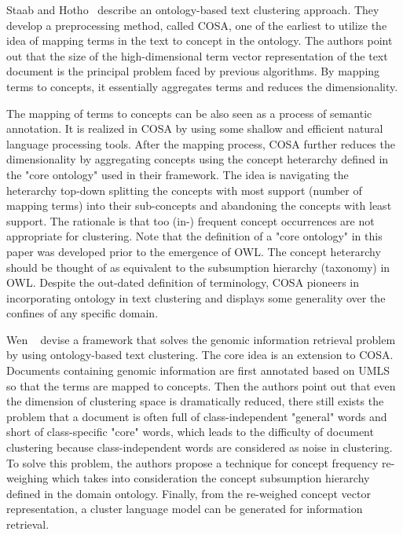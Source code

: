 Staab and Hotho~\cite{StaabH03} describe an ontology-based text clustering approach. They develop a preprocessing method, called COSA, one of the earliest to utilize the idea of mapping terms in the text to concept in the ontology. The authors point out that the size of the high-dimensional term vector representation of the text document is the principal problem faced by previous algorithms. By mapping terms to concepts, it essentially aggregates terms and reduces the dimensionality.

The mapping of terms to concepts can be also seen as a process of semantic annotation. It is realized in COSA by using some shallow and efficient natural language processing tools. After the mapping process, COSA further reduces the dimensionality by aggregating concepts using the concept heterarchy defined in the "core ontology" used in their framework. The idea is navigating the heterarchy top-down splitting the concepts with most support (number of mapping terms) into their sub-concepts and abandoning the concepts with least support. The rationale is that too (in-) frequent concept occurrences are not appropriate for clustering.  Note that the definition of a "core ontology" in this paper was developed prior to the emergence of OWL. The concept heterarchy should be thought of as equivalent to the subsumption hierarchy (taxonomy) in OWL. Despite the out-dated definition of terminology, COSA pioneers in incorporating ontology in text clustering and displays some generality over the confines of any specific domain.

Wen \etal~\cite{Wen2007Ont} devise a framework that solves the genomic information retrieval problem by using ontology-based text clustering. The core idea is an extension to COSA. Documents containing genomic information are first annotated based on UMLS so that the terms are mapped to concepts. Then the authors point out that even the dimension of clustering space is dramatically reduced, there still exists the problem that a document is often full of class-independent "general" words and short of class-specific "core" words, which leads to the difficulty of document clustering because class-independent words are considered as noise in clustering. To solve this problem, the authors propose a technique for concept frequency re-weighing which takes into consideration the concept subsumption hierarchy defined in the domain ontology. Finally, from the re-weighed concept vector representation, a cluster language model can be generated for information retrieval.

